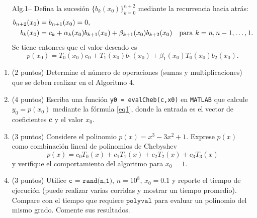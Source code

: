 \documentclass[12pt,final,twoside,notitlepage]{article}
\begin{document}
\begin{enumerate}
{\begin{itemize}
\item[Alg.1--] 
Defina la sucesión $\lbrace b_k(x_0)\rbrace_{k=0}^{n+2}$ mediante la recurrencia hacia atrás:
\begin{align*}
b_{n+2}(x_0) &= b_{n+1}(x_0) = 0,\\
b_k(x_0) &= c_k + \alpha_k(x_0) b_{k+1}(x_0) + \beta_{k+1}(x_0) b_{k+2}(x_0)\quad {\rm para }\ k = n,n-1,\ldots,1.
\end{align*}
Se tiene entonces que el valor deseado es 
\begin{equation} \label{eq1}
p(x_0) = T_0(x_0) c_0 + T_1(x_0) b_1(x_0)+\beta_1(x_0) T_0(x_0) b_2(x_0).
\end{equation}
\end{itemize}

\begin{enumerate}
\item (2 puntos) Determine el número de operaciones (sumas y multiplicaciones) que se deben realizar en el Algoritmo 4.
\item (4 puntos) Escriba una función \texttt{y0 = evalCheb(c,x0)} en \texttt{MATLAB} que calcule $y_0 = p(x_0)$ mediante la fórmula \eqref{eq1}, donde la entrada es el vector de coeficientes $\bm{c}$ y el valor $x_0$.
\item (3 puntos) Considere el polinomio $p(x) = x^3-3x^2+1$. Exprese $p(x)$ como combinación lineal de polinomios de Chebyshev $$p(x) = c_0 T_0(x) + c_1 T_1(x) + c_2 T_2(x) + c_3 T_3(x)$$ y verifique el comportamiento del algoritmo para $x_0=1$.
\item (3 puntos) Utilice $\texttt{c = rand(n,1)}$, $n=10^8$, $x_0 = 0.1$ y reporte el tiempo de ejecución (puede realizar varias corridas y mostrar un tiempo promedio). Compare con el tiempo que requiere $\texttt{polyval}$ para evaluar un polinomio del mismo grado. Comente sus resultados.
\end{enumerate}
}



\end{enumerate}
\end{document}
